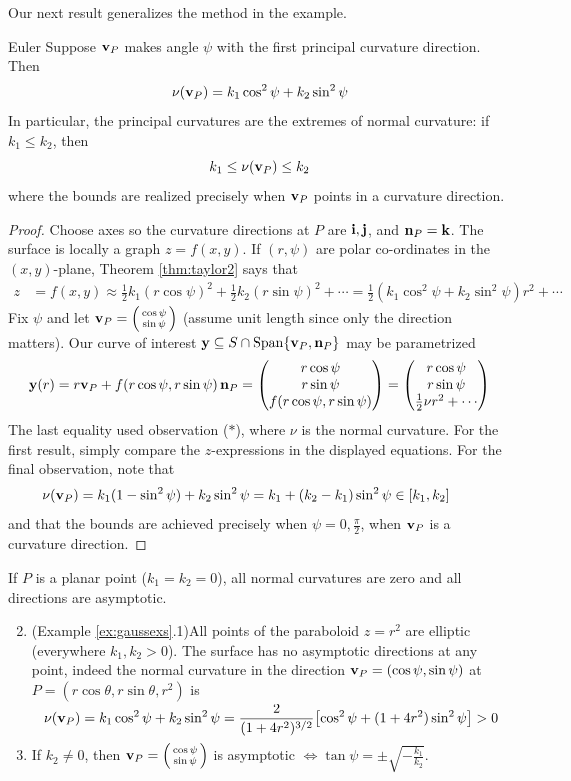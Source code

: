 Our next result generalizes the method in the example.

\begin{thm}{Euler}{}
	Suppose ${\mathbf{v}}_P$ makes angle $\psi$ with the first principal curvature direction. Then
	\[
		\nu({\mathbf{v}}_P)=k_1\cos^2\psi +k_2\sin^2\psi
	\]
	In particular, the principal curvatures are the extremes of normal curvature: if $k_1\le k_2$, then
	\[
		k_1\le\nu({\mathbf{v}}_P)\le k_2
	\]
	where the bounds are realized precisely when ${\mathbf{v}}_P$ points in a curvature direction.
\end{thm}

\begin{proof}
	Choose axes so the curvature directions at $P$ are ${\mathbf{i}},{\mathbf{j}}$, and ${\mathbf{n}}_P={\mathbf{k}}$. The surface is locally a graph $z=f(x,y)$. If $(r,\psi)$ are polar co-ordinates in the $(x,y)$-plane, Theorem \ref{thm:taylor2} says that 
	\begin{align*}
		z&=f(x,y)\approx \tfrac{1}{2}k_1(r\cos\psi)^2+\tfrac{1}{2}k_2(r\sin\psi)^2+\cdots= \frac 12(k_1\cos^2\psi+k_2\sin^2\psi)r^2+\cdots
	\end{align*}
	Fix $\psi$ and let ${\mathbf{v}}_P=\left(\begin{smallmatrix}\cos\psi\\\sin\psi\end{smallmatrix}\right)$ (assume unit length since only the direction matters). Our curve of interest ${\mathbf{y}}\subseteq S\cap\operatorname{Span}\{{\mathbf{v}}_P,{\mathbf{n}}_P\}$ may be parametrized
	\[
		{\mathbf{y}}(r)= r{\mathbf{v}}_P+f(r\cos\psi,r\sin\psi)\,{\mathbf{n}}_P= \begin{pmatrix}r\cos\psi\\r\sin\psi\\f(r\cos\psi,r\sin\psi)\end{pmatrix} =\begin{pmatrix}r\cos\psi\\r\sin\psi\\\frac 12\nu r^2+\cdots\end{pmatrix}
	\]
	The last equality used observation ($\ast$), where $\nu$ is the normal curvature. For the first result, simply compare the $z$-expressions in the displayed equations. For the final observation, note that
	\[
		\nu({\mathbf{v}}_P) =k_1(1-\sin^2\psi)+k_2\sin^2\psi =k_1+(k_2-k_1)\sin^2\psi\in[k_1,k_2] \tag*{\qedhere}
	\]
	and that the bounds are achieved precisely when $\psi=0,\frac\pi 2$, when ${\mathbf{v}}_P$ is a curvature direction.
\end{proof}


\begin{examples}{}{}
	\exstart If $P$ is a planar point ($k_1=k_2=0$), all normal curvatures are zero and all directions are asymptotic.
	\begin{enumerate}\setcounter{enumi}{1}
  	\item (Example \ref{ex:gaussexs}.1)\lstsp All points of the paraboloid $z=r^2$ are elliptic (everywhere $k_1,k_2>0$). The surface has no asymptotic directions at any point, indeed the normal curvature in the direction ${\mathbf{v}}_P=(\cos\psi,\sin\psi)$ at $P=(r\cos\theta,r\sin\theta,r^2)$ is
		\[
			\nu({\mathbf{v}}_P)=k_1\cos^2\psi+k_2\sin^2\psi =\smash{\frac 2{(1+4r^2)^{3/2}}}\bigl[\cos^2\psi+(1+4r^2)\sin^2\psi\bigr]>0
		\]
		\item If $k_2\neq 0$, then ${\mathbf{v}}_P=\left(\begin{smallmatrix}\cos\psi\\\sin\psi\end{smallmatrix}\right)$ is asymptotic $\iff\tan\psi=\pm\sqrt{-\frac{k_1}{k_2}}$.
	\end{enumerate}
\end{examples}


